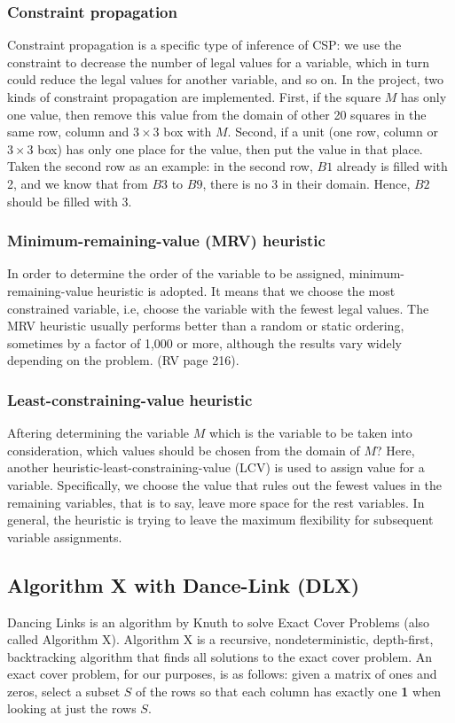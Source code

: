 		\subsubsection{Constraint propagation}
			Constraint propagation is a specific type of inference of CSP: 
			we use the constraint to decrease the number of legal values for a variable, which in turn could reduce the legal values for another variable, and so on. 
			In the project, two kinds of constraint propagation are implemented. 
			First, if the square $M$ has only one value, then remove this value from the domain of other 20 squares in the same row, column and $3 \times 3$ box with $M$. 
			Second, if a unit (one row, column or $3 \times 3$ box) has only one place for the value, then put the value in that place. 
			Taken the second row as an example: in the second row, $B1$ already is filled with 2, and we know that from $B3$ to $B9$, there is no 3 in their domain. Hence, $B2$ should be filled with 3. 

		\subsubsection{Minimum-remaining-value (MRV) heuristic}
			In order to determine the order of the variable to be assigned, minimum-remaining-value heuristic is adopted. 
			It means that we choose the most constrained variable, i.e, choose the variable with the fewest legal values. 
			The MRV heuristic usually performs better than a random or static ordering, sometimes by a factor of 1,000 or more, although the results vary widely depending on the problem. (RV page 216).

		\subsubsection{Least-constraining-value heuristic}
			Aftering determining the variable $M$ which is the variable to be taken into consideration, which values should be chosen from the domain of $M$?
			Here, another heuristic-least-constraining-value (LCV) is used to assign value for a variable. 
			Specifically,  we choose the value that rules out the fewest values in the remaining variables, 
			that is to say, leave more space for the rest variables. 
			In general, the heuristic is trying to leave the maximum flexibility for subsequent variable assignments.

	\subsection{Algorithm X with Dance-Link (DLX)}
		Dancing Links is an algorithm by Knuth to solve Exact Cover Problems (also called Algorithm X). 
		Algorithm X is a recursive, nondeterministic, depth-first, backtracking algorithm that finds all solutions to the exact cover problem. 
		An exact cover problem, for our purposes, is as follows: given a matrix of ones and zeros, select a subset $S$ of the rows so that each column has exactly one \textbf{1} when looking at just the rows $S$.

